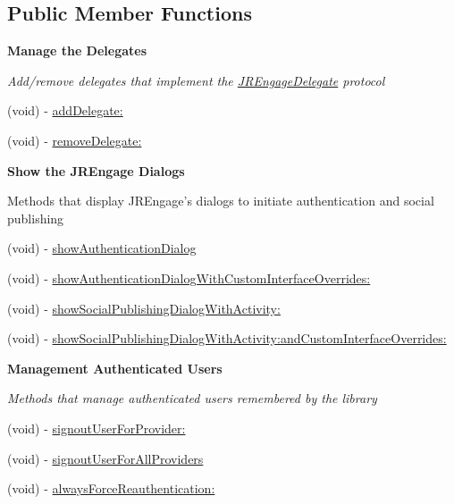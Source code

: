 \subsection*{Public Member Functions}
\begin{Indent}{\bf Manage the Delegates}\par
{\em \label{_amgrpf6bb425cb9b7388d33e37d551db6b02e}
 Add/remove delegates that implement the \hyperlink{protocol_j_r_engage_delegate-p}{JREngageDelegate} protocol }\begin{DoxyCompactItemize}
\item 
(void) -\/ \hyperlink{class_j_r_engage_a18377ffb55f821587e6d38b3489692e8}{addDelegate:}
\item 
(void) -\/ \hyperlink{class_j_r_engage_ab3f12ac148ea0f6df4d7ff7789cc7c94}{removeDelegate:}
\end{DoxyCompactItemize}
\end{Indent}
\begin{Indent}{\bf Show the JREngage Dialogs}\par
{\em \label{_amgrp345603279e1df04f4a3678e78089b7be}
 \label{class_j_r_engage_showMethods}
\hypertarget{class_j_r_engage_showMethods}{}


Methods that display JREngage's dialogs to initiate authentication and social publishing }\begin{DoxyCompactItemize}
\item 
(void) -\/ \hyperlink{class_j_r_engage_a01ecdff491f91543e18f33d0e565b046}{showAuthenticationDialog}
\item 
(void) -\/ \hyperlink{class_j_r_engage_a60a7be6770b99c3a929f7c006f1b1203}{showAuthenticationDialogWithCustomInterfaceOverrides:}
\item 
(void) -\/ \hyperlink{class_j_r_engage_afca7b5ab9a57edc1a460aaec882207c4}{showSocialPublishingDialogWithActivity:}
\item 
(void) -\/ \hyperlink{class_j_r_engage_aa84788326df3e8adf4be6128fccb7708}{showSocialPublishingDialogWithActivity:andCustomInterfaceOverrides:}
\end{DoxyCompactItemize}
\end{Indent}
\begin{Indent}{\bf Management Authenticated Users}\par
{\em \label{_amgrp4247d2361fbfb57c620ed69782a50c95}
 Methods that manage authenticated users remembered by the library }\begin{DoxyCompactItemize}
\item 
(void) -\/ \hyperlink{class_j_r_engage_af1448791663265d3b739041983fbae92}{signoutUserForProvider:}
\item 
(void) -\/ \hyperlink{class_j_r_engage_a56060e8d5fe94e4bf06ff3edf27af5ee}{signoutUserForAllProviders}
\item 
(void) -\/ \hyperlink{class_j_r_engage_a66dca1abdfd5103480f9a87f65923a68}{alwaysForceReauthentication:}
\end{DoxyCompactItemize}
\end{Indent}
